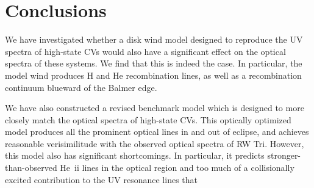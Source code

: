 \documentclass[preprint, a4paper, 11pt]{aastex}
\begin{document}
















%
%


\section{Conclusions}

We have investigated whether a disk wind model designed to reproduce
the UV spectra of high-state CVs would also have a significant effect
on the optical spectra of these systems. We find that this is indeed
the case. In particular, the model wind produces H and He
recombination lines, as well as a recombination continuum blueward of
the Balmer edge. 

We have also constructed a revised benchmark model which is designed
to more closely match the optical spectra of high-state CVs. This
optically optimized model produces all the prominent optical lines in
and out of eclipse, and achieves reasonable verisimilitude with the
observed optical spectra of RW Tri. However, this model also has
significant shortcomings. In particular, it predicts
stronger-than-observed He~{\sc ii} lines in the optical region and too
much of a collisionally excited contribution to the UV resonance lines
that  
\end{document}
